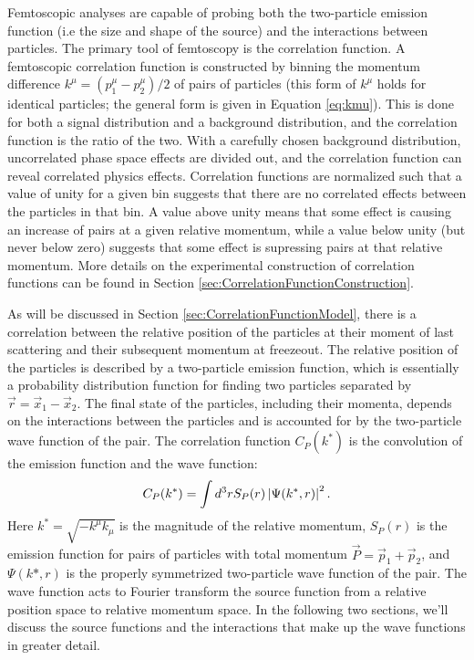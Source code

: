 Femtoscopic analyses are capable of probing both the two-particle emission function (i.e the size and shape of the source) and the interactions between particles. 
The primary tool of femtoscopy is the correlation function.
A femtoscopic correlation function is constructed by binning the momentum difference $k^\mu = (p_1^\mu - p_2^\mu)/2$ of pairs of particles (this form of $k^\mu$ holds for identical particles; the general form is given in Equation \ref{eq:kmu}).
This is done for both a signal distribution and a background distribution, and the correlation function is the ratio of the two.
With a carefully chosen background distribution, uncorrelated phase space effects are divided out, and the correlation function can reveal correlated physics effects.
Correlation functions are normalized such that a value of unity for a given bin suggests that there are no correlated effects between the particles in that bin.
A value above unity means that some effect is causing an increase of pairs at a given relative momentum, while a value below unity (but never below zero) suggests that some effect is supressing pairs at that relative momentum.
More details on the experimental construction of correlation functions can be found in Section \ref{sec:CorrelationFunctionConstruction}.

As will be discussed in Section \ref{sec:CorrelationFunctionModel}, there is a correlation between the relative position of the particles at their moment of last scattering and their subsequent momentum at freezeout.
The relative position of the particles is described by a two-particle emission function, which is essentially a probability distribution function for finding two particles separated by $\vec{r} = \vec{x}_1 - \vec{x}_2$.
The final state of the particles, including their momenta, depends on the interactions between the particles and is accounted for by the two-particle wave function of the pair.
The correlation function $C_P(k^*)$ is the convolution of the emission function and the wave function:
\begin{equation}
\label{eq:KooninPrattInIntro}
C_P(k^*) =  \int d^3r S_{P} (r) \left\lvert\Psi(k^*,r)\right\rvert^2.
\end{equation}
Here $k^* = \sqrt{-k^\mu k_\mu}$ is the magnitude of the relative momentum, $S_P(r)$ is the emission function for pairs of particles with total momentum $\vec{P} = \vec{p}_1 + \vec{p}_2$, and $\Psi(k*,r)$ is the properly symmetrized two-particle wave function of the pair.
The wave function acts to Fourier transform the source function from a relative position space to relative momentum space.
In the following two sections, we'll discuss the source functions and the interactions that make up the wave functions in greater detail.

